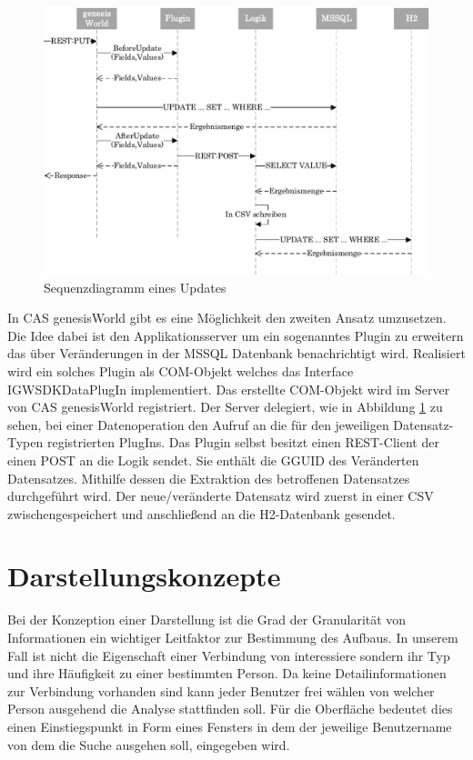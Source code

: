 \begin{figure}[htbp]
\centering
  \includegraphics[width=1.0\textwidth, width=1.0\textwidth]{pics/sequenzdiagramm.pdf}
\caption{Sequenzdiagramm eines Updates}
\label{konzept_sequenz}
\end{figure}

In CAS genesisWorld gibt es eine Möglichkeit den zweiten Ansatz umzusetzen. Die Idee dabei ist den Applikationsserver um ein sogenanntes Plugin zu erweitern das über Veränderungen in der MSSQL Datenbank benachrichtigt wird. Realisiert wird ein solches Plugin als COM-Objekt welches das Interface IGWSDKDataPlugIn implementiert. Das erstellte COM-Objekt wird im Server von CAS genesisWorld registriert. Der Server delegiert, wie in Abbildung \ref{konzept_sequenz} zu sehen, bei einer Datenoperation den Aufruf an die für den jeweiligen Datensatz-Typen registrierten PlugIns. Das Plugin selbst besitzt einen REST-Client der einen POST an die Logik sendet. Sie enthält die GGUID des Veränderten Datensatzes. Mithilfe dessen die Extraktion des betroffenen Datensatzes durchgeführt wird. Der neue/veränderte Datensatz wird zuerst in einer CSV zwischengespeichert und anschließend an die H2-Datenbank gesendet.

\section{Darstellungskonzepte}

Bei der Konzeption einer Darstellung ist die Grad der Granularität von Informationen ein wichtiger Leitfaktor zur Bestimmung des Aufbaus. In unserem Fall ist nicht die Eigenschaft einer Verbindung von interessiere sondern ihr Typ und ihre Häufigkeit zu einer bestimmten Person. Da keine Detailinformationen zur Verbindung vorhanden sind kann jeder Benutzer frei wählen von welcher Person ausgehend die Analyse stattfinden soll. Für die Oberfläche bedeutet dies einen Einstiegspunkt in Form eines Fensters in dem der jeweilige Benutzername von dem die Suche ausgehen soll, eingegeben wird.

